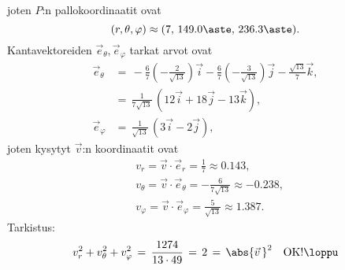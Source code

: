 joten $P$:n pallokoordinaatit ovat
\[
(r,\theta,\varphi) \approx (7,\,149.0\aste,\,236.3\aste).
\]
Kantavektoreiden $\vec e_\theta,\vec e_\varphi$ tarkat arvot ovat
\begin{align*}
\vec e_\theta  &=\,-\frac{6}{7}\left(-\frac{2}{\sqrt{13}}\right)\vec i
                  -\frac{6}{7}\left(-\frac{3}{\sqrt{13}}\right)\vec j
                  -\frac{\sqrt{13}}{7}\vec k, \\
               &=\,\frac{1}{7\sqrt{13}}\,(12\vec i+18\vec j-13\vec k), \\
\vec e_\varphi &=\,\frac{1}{\sqrt{13}}\,(3\vec i-2\vec j),
\end{align*}
joten kysytyt $\vec v$:n koordinaatit ovat
\begin{align*}
&v_r       = \vec v\cdot\vec e_r       =  \frac{1}{7}          \approx  0.143, \\
&v_\theta  = \vec v\cdot\vec e_\theta  = -\frac{6}{7\sqrt{13}} \approx -0.238, \\
&v_\varphi = \vec v\cdot\vec e_\varphi =  \frac{5}{\sqrt{13}}  \approx  1.387.
\end{align*}
Tarkistus:
\[
v_r^2+v_\theta^2+v_\varphi^2\,=\,\frac{1274}{13 \cdot 49}\,
                              =\,2\,=\,\abs{\vec v\,}^2 \quad\text{OK!} \loppu
\]

